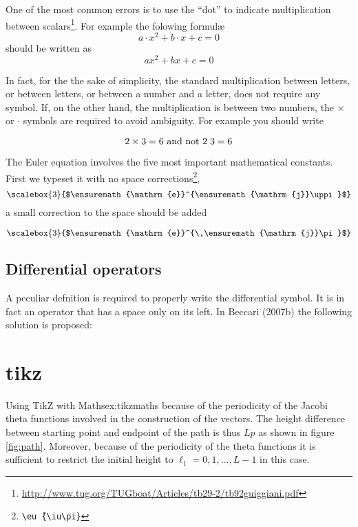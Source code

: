 {

One of the most common errors is to use the ``dot'' to indicate multiplication between scalars\footnote{\url{http://www.tug.org/TUGboat/Articles/tb29-2/tb92guiggiani.pdf}}. For example the folowing formul\ae
\[a\cdot x^2+b\cdot x+c=0\]
should be written as
\[ax^2+bx+c=0\]

In fact, for the the sake of simplicity, the standard multiplication between letters, or between letters, or between a number and a letter, does not require any symbol. If, on the other hand, the multiplication is between two numbers, the $\times$ or $\cdot$ symbols are required to avoid ambiguity.
For example you should write

\[2\times 3=6 \text{ and not } 2\thickspace 3=6 \]



The Euler equation involves the five most important mathematical constants. First we typeset it with no space corrections\footnote{\texttt{\textbackslash eu\^\,\{\textbackslash iu\textbackslash pi\}}},
\providecommand*{\eu}%
{\ensuremath{\mathrm{e}}}
\providecommand*{\iu}%
{\ensuremath{\mathrm{j}}}
\[\scalebox{3}{$\eu^{\iu\uppi}$}\]
a small correction to the space should be added

\[\scalebox{3}{$\eu^{\,\iu\pi}$}\]

\subsection{Differential operators}
A peculiar defnition is required to properly
write the differential symbol. It is in fact an operator that has a space only on its left. In Beccari (2007b) the following solution is proposed:

\bigskip


\clearpage
\section{tikz}
\begin{texexample}{Using TikZ with Maths}{ex:tikzmaths}
because of the periodicity of the Jacobi theta functions involved in the construction of the vectors.
The height difference between starting point and endpoint of the path is thus $Lp$ as shown in figure \ref{fig:path}. Moreover, because of the periodicity of the theta functions it is sufficient to restrict the initial height to $\ell_1=0,1,\dots,L-1$ in this case.


\end{texexample}}
